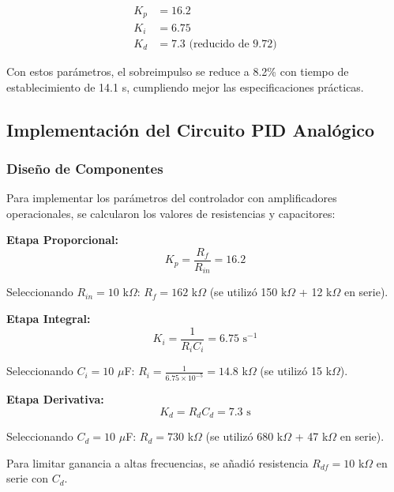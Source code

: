 \documentclass[conference]{IEEEtran}
\begin{document}
\begin{align}
K_p &= 16.2 \\
K_i &= 6.75 \\
K_d &= 7.3 \text{ (reducido de 9.72)}
\end{align}

Con estos parámetros, el sobreimpulso se reduce a 8.2\% con tiempo de establecimiento de 14.1 s, cumpliendo mejor las especificaciones prácticas.

\subsection{Implementación del Circuito PID Analógico}

\subsubsection{Diseño de Componentes}

Para implementar los parámetros del controlador con amplificadores operacionales, se calcularon los valores de resistencias y capacitores:

\textbf{Etapa Proporcional:}
\begin{equation}
K_p = \frac{R_f}{R_{in}} = 16.2
\end{equation}

Seleccionando $R_{in} = 10$ k$\Omega$: $R_f = 162$ k$\Omega$ (se utilizó 150 k$\Omega$ + 12 k$\Omega$ en serie).

\textbf{Etapa Integral:}
\begin{equation}
K_i = \frac{1}{R_i C_i} = 6.75 \text{ s}^{-1}
\end{equation}

Seleccionando $C_i = 10$ $\mu$F: $R_i = \frac{1}{6.75 \times 10^{-5}} = 14.8$ k$\Omega$ (se utilizó 15 k$\Omega$).

\textbf{Etapa Derivativa:}
\begin{equation}
K_d = R_d C_d = 7.3 \text{ s}
\end{equation}

Seleccionando $C_d = 10$ $\mu$F: $R_d = 730$ k$\Omega$ (se utilizó 680 k$\Omega$ + 47 k$\Omega$ en serie).

Para limitar ganancia a altas frecuencias, se añadió resistencia $R_{df} = 10$ k$\Omega$ en serie con $C_d$.
\end{document}
